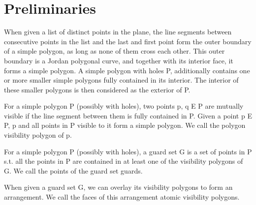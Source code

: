 \chapter{Preliminaries}
\begin{definition}
When given a list of distinct points in the plane, the line segments between consecutive points in the list and the last and first point form the outer boundary of a simple polygon, as long as none of them cross each other. This outer boundary is a Jordan polygonal curve, and together with its interior face, it forms a simple polygon. A simple polygon with holes P, additionally contains one or more smaller simple polygons fully contained in its interior. The interior of these smaller polygons is then considered as the exterior of P.
\end{definition}

\begin{definition}
For a simple polygon P (possibly with holes), two points p, q E P are mutually visible if the line segment between them is fully contained in P. Given a point p E P, p and all points in P visible to it form a simple polygon. We call the polygon visibility polygon of p.
\end{definition}

\begin{definition}
For a simple polygon P (possibly with holes), a guard set G is a set of points in P s.t. all the points in P are contained in at least one of the visibility polygons of G. We call the points of the guard set guards.
\end{definition}

\begin{definition}
When given a guard set G, we can overlay its visibility polygons to form an arrangement. We call the faces of this arrangement atomic visibility polygons. 
\end{definition}

\begin{definition}
    
\end{definition}

\begin{definition}
    
\end{definition}

\begin{definition}
    
\end{definition}

\begin{definition}
    
\end{definition}

\begin{definition}
    
\end{definition}